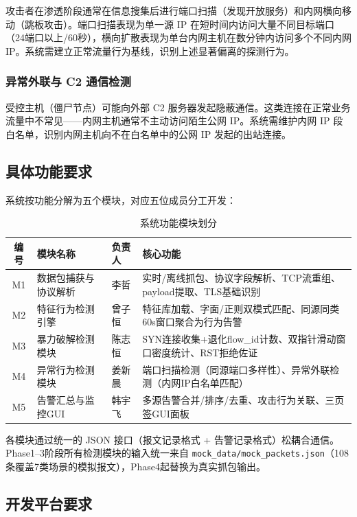 \documentclass[12pt,a4paper]{ctexart}
\begin{document}
攻击者在渗透阶段通常在信息搜集后进行端口扫描（发现开放服务）和内网横向移动（跳板攻击）。端口扫描表现为单一源 IP 在短时间内访问大量不同目标端口（24端口以上/60秒），横向扩散表现为单台内网主机在数分钟内访问多个不同内网 IP。系统需建立正常流量行为基线，识别上述显著偏离的探测行为。

\subsubsection{异常外联与 C2 通信检测}

受控主机（僵尸节点）可能向外部 C2 服务器发起隐蔽通信。这类连接在正常业务流量中不常见——内网主机通常不主动访问陌生公网 IP。系统需维护内网 IP 段白名单，识别内网主机向不在白名单中的公网 IP 发起的出站连接。

\subsection{具体功能要求}

系统按功能分解为五个模块，对应五位成员分工开发：

\begin{table}[H]
\centering
\caption{系统功能模块划分}
\label{tab:modules}
\small
\begin{tabular}{@{}cllp{5.5cm}@{}}
\toprule
编号 & 模块名称 & 负责人 & 核心功能 \\
\midrule
M1 & 数据包捕获与协议解析 & 李哲 & 实时/离线抓包、协议字段解析、TCP流重组、payload提取、TLS基础识别 \\
M2 & 特征行为检测引擎     & 曾子恒 & 特征库加载、字面/正则双模式匹配、同源同类60s窗口聚合为行为告警 \\
M3 & 暴力破解检测模块     & 陈志恒 & SYN连接收集+退化flow\_id计数、双指针滑动窗口密度统计、RST拒绝佐证 \\
M4 & 异常行为检测模块     & 姜新晨 & 端口扫描检测（同源端口多样性）、异常外联检测（内网IP白名单匹配） \\
M5 & 告警汇总与监控GUI    & 韩宇飞 & 多源告警合并/排序/去重、攻击行为关联、三页签GUI面板 \\
\bottomrule
\end{tabular}
\end{table}

各模块通过统一的 JSON 接口（报文记录格式 + 告警记录格式）松耦合通信。Phase1--3阶段所有检测模块的输入统一来自 \texttt{mock\_data/mock\_packets.json}（108条覆盖7类场景的模拟报文），Phase4起替换为真实抓包输出。

\subsection{开发平台要求}
\end{document}
